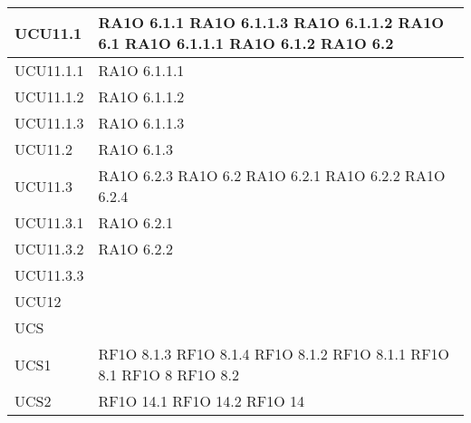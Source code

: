 \begin{center}
\begin{longtable}{ | p{5cm} | p{5cm} |}
            UCU11.1 &  RA1O 6.1.1  \newline  RA1O 6.1.1.3  \newline  RA1O 6.1.1.2 \newline  RA1O 6.1  \newline  RA1O 6.1.1.1  \newline  RA1O 6.1.2  \newline  RA1O 6.2  \newline  \\ \hline      
            UCU11.1.1 &  RA1O 6.1.1.1  \newline  \\ \hline      
            UCU11.1.2 &  RA1O 6.1.1.2 \newline  \\ \hline      
            UCU11.1.3 &  RA1O 6.1.1.3  \newline  \\ \hline      
            UCU11.2 &  RA1O 6.1.3  \newline  \\ \hline      
            UCU11.3 &  RA1O 6.2.3 \newline  RA1O 6.2  \newline  RA1O 6.2.1 \newline  RA1O 6.2.2 \newline  RA1O 6.2.4 \newline  \\ \hline      
            UCU11.3.1 &  RA1O 6.2.1 \newline  \\ \hline      
            UCU11.3.2 &  RA1O 6.2.2 \newline  \\ \hline      
            UCU11.3.3 &  \\ \hline      
            UCU12 &  \\ \hline      
            UCS &  \\ \hline      
            UCS1 &  RF1O 8.1.3  \newline  RF1O 8.1.4  \newline  RF1O 8.1.2 \newline  RF1O 8.1.1  \newline  RF1O 8.1  \newline  RF1O 8  \newline  RF1O 8.2  \newline  \\ \hline      
            UCS2 &  RF1O 14.1 \newline  RF1O 14.2 \newline  RF1O 14 \newline  \\ \hline      

\end{longtable}
\end{center}
